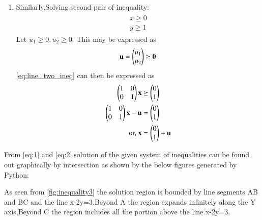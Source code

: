 \documentclass[journal,12pt,twocolumn]{IEEEtran}
\begin{document}
\begin{enumerate}
    \item Similarly,Solving second pair of inequality:
    \begin{align}
\label{eq:line_two_ineq}
\begin{split}
    x\geq 0
\\
    y \geq 1
\end{split}
\end{align}
\solution  Let $u_1 \ge 0, u_2 \ge 0$.  This may be expressed as
\begin{align}
\mathbf{u} = \begin{pmatrix}u_1\\u_2\end{pmatrix}\succeq \mathbf{0}
\end{align}
%
\eqref{eq:line_two_ineq} can then be expressed as
\begin{align}
\begin{pmatrix}1 & 0 \\ 0 & 1\end{pmatrix}\mathbf{x}  &\succeq \begin{pmatrix}0\\1\end{pmatrix}
\\
\begin{pmatrix}1 & 0 \\ 0 & 1\end{pmatrix}\mathbf{x}  -\mathbf{u}&=\begin{pmatrix}0\\1\end{pmatrix}
\\
\text{or, }
\mathbf{x} &= \begin{pmatrix}0\\1\end{pmatrix} +\mathbf{u}\label{eq:2}
\end{align}
\end{enumerate}
From \eqref{eq:1} and \eqref{eq:2},solution of the given system of inequalities can be found out graphically by intersection as shown by the below figures generated by Python:

As seen from \ref{fig:inequality3} the solution region is bounded by line segments AB and BC and the line x-2y=3.Beyond A the region expands infinitely along the Y axis,Beyond C the region includes all the portion above the line x-2y=3.
\end{document}
